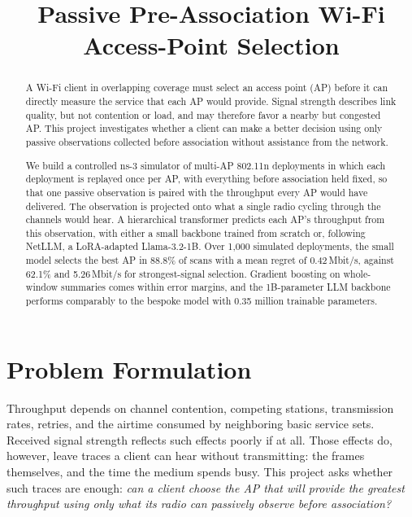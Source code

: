 \documentclass[conference]{IEEEtran}
\title{Passive Pre-Association Wi-Fi Access-Point Selection}
\author{
\IEEEauthorblockN{U.K.Arvindan}
\IEEEauthorblockA{EP21B006}
}
\begin{document}
\maketitle

\begin{abstract}
A Wi-Fi client in overlapping coverage must select an access point (AP)
before it can directly measure the service that each AP would provide.
Signal strength describes link quality, but not contention or load, and may
therefore favor a nearby but congested AP. This project investigates whether a
client can make a better decision using only passive observations collected
before association without assistance from the network.

We build a controlled ns-3 simulator of multi-AP 802.11n deployments in which
each deployment is replayed once per AP, with everything before association
held fixed, so that one passive observation is paired with the throughput
every AP would have delivered. The observation is projected onto what a single
radio cycling through the channels would hear. A hierarchical transformer predicts 
each AP's throughput from this observation, with either a small backbone trained 
from scratch or, following NetLLM, a LoRA-adapted Llama-3.2-1B. Over 1,000 simulated
deployments, the small model selects the best AP in 88.8\% of scans with a mean
regret of 0.42\,Mbit/s, against 62.1\% and 5.26\,Mbit/s for strongest-signal
selection. Gradient boosting on whole-window summaries comes within error margins, 
and the 1B-parameter LLM backbone performs comparably to the bespoke model 
with 0.35 million trainable parameters.


\end{abstract}

\section{Problem Formulation}
\label{sec:problem}

Throughput depends on channel contention, competing stations, transmission
rates, retries, and the airtime consumed by neighboring basic service sets.
Received signal strength reflects such effects poorly if at all. Those effects do,
however, leave traces a client can hear without transmitting: the frames
themselves, and the time the medium spends busy. 
This project asks whether such traces are enough: \emph{can a client choose 
the AP that will provide the greatest throughput using only what its radio 
can passively observe before association?}
\end{document}

